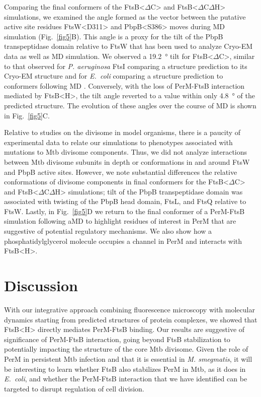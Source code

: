 \documentclass[twocolumn,pdflatex,sn-nature]{sn-jnl}%
\def\textsuperscript#1{<#1>}%
\newcommand\ec{\textit{E.~coli}}
\newcommand\mtb{Mtb}
\newcommand\msmeg{\textit{M. smegmatis}}
\newcommand\pa{\textit{P. aeruginosa}}
\newcommand\ftsbH{FtsB\textsuperscript{H}}
\newcommand\ftsbdCdH{FtsB\textsuperscript{$\Delta{}$C$\Delta{}$H}}
\newcommand\ftsbdC{FtsB\textsuperscript{$\Delta{}$C}}
\begin{document}
Comparing the final conformers of the \ftsbdC{} and \ftsbdCdH{} simulations, we examined the angle formed as the vector between the putative active site residues FtsW\textsuperscript{D311} and PbpB\textsuperscript{S386} moves during MD simulation (Fig.~\ref{fig5}B).
This angle is a proxy for the tilt of the PbpB transpeptidase domain relative to FtsW that has been used to analyze Cryo-EM data as well as MD simulation.
We observed a \qty{19.2}{\degree} tilt for \ftsbdC{}, similar to that observed for \pa{} FtsI comparing a structure prediction to its Cryo-EM structure \citep{kashammerCryoEMStructureBacterial2023} and for \ec{} comparing a structure prediction to conformers following MD \citep{brittonConformationalChangesEssential2023}.
Conversely, with the loss of PerM-FtsB interaction mediated by \ftsbH{}, the tilt angle reverted to a value within only \qty{4.8}{\degree} of the predicted structure.
The evolution of these angles over the course of MD is shown in Fig.~\ref{fig5}C.

Relative to studies on the divisome in model organisms, there is a paucity of experimental data to relate our simulations to phenotypes associated with mutations to \mtb{} divisome components.
Thus, we did not analyze interactions between \mtb{} divisome subunits in depth or conformations in and around FtsW and PbpB active sites.
However, we note substantial differences the relative conformations of divisome components in final conformers for the \ftsbdC{} and \ftsbdCdH{} simulations; tilt of the PbpB transpeptidase domain was associated with twisting of the PbpB head domain, FtsL, and FtsQ relative to FtsW.
Lastly, in Fig.~\ref{fig5}D we return to the final conformer of a PerM-FtsB simulation following aMD to highlight residues of interest in PerM that are suggestive of potential regulatory mechanisms.
We also show how a phosphatidylglycerol molecule occupies a channel in PerM and interacts with \ftsbH{}.

\section{Discussion}

With our integrative approach combining fluorescence microscopy with molecular dynamics starting from predicted structures of protein complexes, we showed that \ftsbH{} directly mediates PerM-FtsB binding.
Our results are suggestive of significance of PerM-FtsB interaction, going beyond FtsB stabilization \citep{wangPersistentMycobacteriumTuberculosis2019} to potentially impacting the structure of the core \mtb{} divisome.
Given the role of PerM in persistent \mtb{} infection and that it is essential in \msmeg{}, it will be interesting to learn whether FtsB also stabilizes PerM in \mtb{}, as it does in \ec{}, and whether the PerM-FtsB interaction that we have identified can be targeted to disrupt regulation of cell division.
\end{document}
